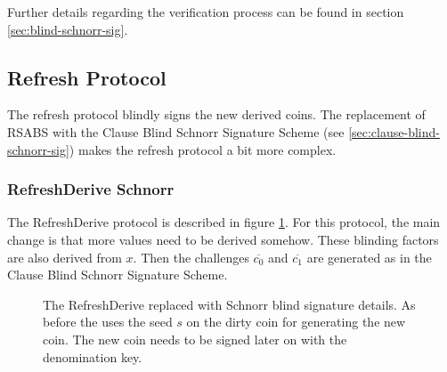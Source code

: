 Further details regarding the verification process can be found in section \ref{sec:blind-schnorr-sig}.


\subsection{Refresh Protocol}
The refresh protocol blindly signs the new derived coins.
The replacement of \gls{RSABS} with the Clause Blind Schnorr Signature Scheme (see \ref{sec:clause-blind-schnorr-sig}) makes the refresh protocol a bit more complex.

\subsubsection{RefreshDerive Schnorr}
The RefreshDerive protocol is described in figure \ref{fig:refresh-derive-schnorr}.
For this protocol, the main change is that more values need to be derived somehow.
These blinding factors are also derived from $x$.
Then the challenges $\overline{c_0}$ and $\overline{c_1}$ are generated as in the Clause Blind Schnorr Signature Scheme.

\begin{figure}[htp]
  \centering
  \caption[RefreshDerive algorithm]{The RefreshDerive replaced with Schnorr blind signature details. As before the uses the seed $s$ on the dirty coin for generating the new coin.
    The new coin needs to be signed later on with the denomination key.}
  \label{fig:refresh-derive-schnorr}
\end{figure}

